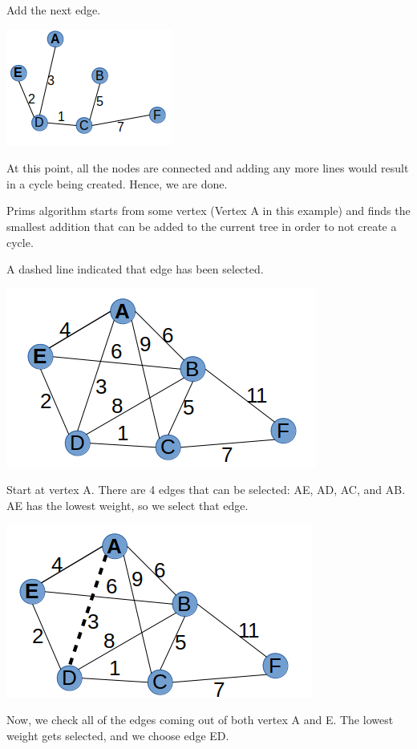 \documentclass{article}
\begin{document}
Add the next edge. 

\includegraphics[scale=0.5]{./P13/kruskals/5}

At this point, all the nodes are connected and adding any more lines would result in a cycle being created. Hence, we are done. 



Prims algorithm starts from some vertex (Vertex A in this example) and finds the smallest addition that can be added to the current tree in order to not create a cycle. 

A dashed line indicated that edge has been selected. 

\includegraphics[scale=0.5]{./P13/prims/0}

Start at vertex A. There are 4 edges that can be selected: AE, AD, AC, and AB. AE has the lowest weight, so we select that edge. 

\includegraphics[scale=0.5]{./P13/prims/1}

Now, we check all of the edges coming out of both vertex A and E. The lowest weight gets selected, and we choose edge ED. 
\end{document}
